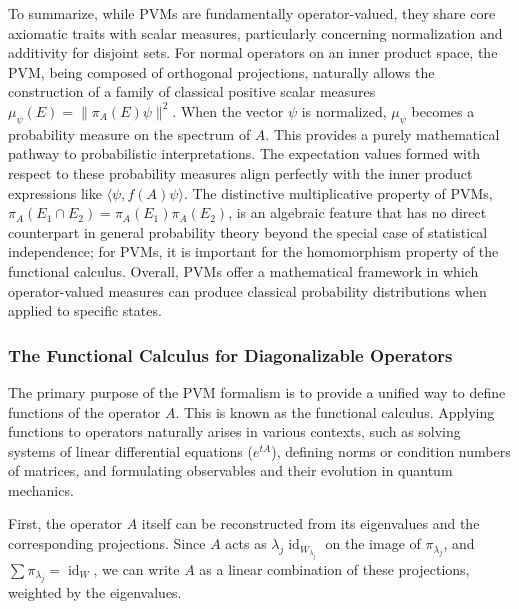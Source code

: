 To summarize, while PVMs are fundamentally operator-valued, they share core axiomatic traits with scalar measures, particularly concerning normalization and additivity for disjoint sets. For normal operators on an inner product space, the PVM, being composed of orthogonal projections, naturally allows the construction of a family of classical positive scalar measures $\mu_\psi(E) = \|\pi_A(E)\psi\|^2$. When the vector $\psi$ is normalized, $\mu_\psi$ becomes a probability measure on the spectrum of $A$. This provides a purely mathematical pathway to probabilistic interpretations. The expectation values formed with respect to these probability measures align perfectly with the inner product expressions like $\langle \psi, f(A)\psi \rangle$. The distinctive multiplicative property of PVMs, $\pi_A(E_1 \cap E_2) = \pi_A(E_1)\pi_A(E_2)$, is an algebraic feature that has no direct counterpart in general probability theory beyond the special case of statistical independence; for PVMs, it is important for the homomorphism property of the functional calculus. Overall, PVMs offer a mathematical framework in which operator-valued measures can produce classical probability distributions when applied to specific states.

\subsubsection{The Functional Calculus for Diagonalizable Operators}
\label{subsec:functional_calculus_finite}

The primary purpose of the PVM formalism is to provide a unified way to define functions of the operator $A$. This is known as the functional calculus. Applying functions to operators naturally arises in various contexts, such as solving systems of linear differential equations ($e^{tA}$), defining norms or condition numbers of matrices, and formulating observables and their evolution in quantum mechanics.

First, the operator $A$ itself can be reconstructed from its eigenvalues and the corresponding projections. Since $A$ acts as $\lambda_j \operatorname{id}_{W_{\lambda_j}}$ on the image of $\pi_{\lambda_j}$, and $\sum \pi_{\lambda_j} = \operatorname{id}_W$, we can write $A$ as a linear combination of these projections, weighted by the eigenvalues.

